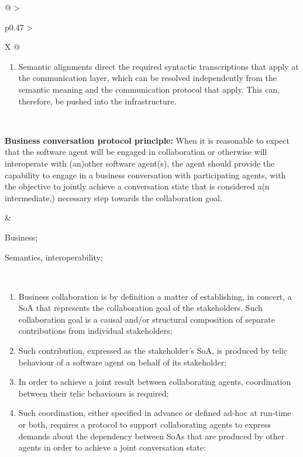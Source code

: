 \begin{xltabular}[l]{\linewidth}{@{} >{\small\raggedright\arraybackslash}p{0.47\linewidth} >{\small\raggedright\arraybackslash}X @{}}
\begin{enumerate}[left=10pt, nosep]
  \item Semantic alignments direct the required syntactic transcriptions that apply at the communication layer, which can be resolved independently from the semantic meaning and the communication protocol that apply. This can, therefore, be pushed into the infrastructure.
\end{enumerate} \\
%
%
%
\begin{mmdp}\label{dp:bcpp}{\bfseries Business conversation protocol principle:}
\quad When it is reasonable to expect that the software agent will be engaged in collaboration or otherwise will interoperate with (an)other software agent(s), the agent should provide the capability to engage in a business conversation with participating agents, with the objective to jointly achieve a conversation state that is considered a(n intermediate,) necessary step towards the collaboration goal.
\end{mmdp}
&
\begin{description}[labelwidth=3.7cm,leftmargin=3.7cm+1ex,nosep,topsep=2ex,labelsep=1ex,font=\bfseries]
  \item[Type of information:] Business;
  \item[Quality attributes:] Semantics, interoperability;
\end{description} \\
\begin{enumerate}[left=6pt, nosep]
  \item Business collaboration is by definition a matter of establishing, in concert, a SoA that represents the collaboration goal of the stakeholders. Such collaboration goal is a causal and/or structural composition of separate contributions from individual stakeholders;
  \item Such contribution, expressed as the stakeholder's SoA, is produced by telic behaviour of a software agent on behalf of its stakeholder;
  \item In order to achieve a joint result between collaborating agents, coordination between their telic behaviours is required;
  \item Such coordination, either specified in advance or defined ad-hoc at run-time or both, requires a protocol to support collaborating agents to express demands about the dependency between SoAs that are produced by other agents in order to achieve a joint conversation state:
  \begin{enumerate}

\end{enumerate}
\end{enumerate}
\end{xltabular}
